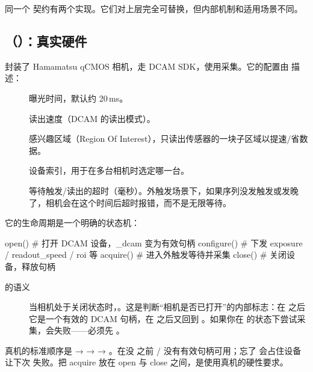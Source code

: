 \documentclass[11pt,oneside,openany]{book}
\begin{document}
同一个  契约有两个实现。它们对上层完全可替换，但内部机制和适用场景不同。

\subsection{（）：真实硬件}

 封装了 Hamamatsu qCMOS 相机，走 DCAM SDK，使用采集。它的配置由  描述：

\begin{description}
\item[] 曝光时间，默认约 20\,ms。
\item[] 读出速度（DCAM 的读出模式）。
\item[] 感兴趣区域（Region Of Interest），只读出传感器的一块子区域以提速/省数据。
\item[] 设备索引，用于在多台相机时选定哪一台。
\item[] 等待触发/读出的超时（毫秒）。外触发场景下，如果序列没发触发或发晚了，相机会在这个时间后超时报错，而不是无限等待。
\end{description}

它的生命周期是一个明确的状态机：

\begin{codeblock}[Python]
open()      # 打开 DCAM 设备，_dcam 变为有效句柄
configure() # 下发 exposure / readout_speed / roi 等
acquire()   # 进入外触发等待并采集
close()     # 关闭设备，释放句柄
\end{codeblock}

\begin{description}
\item[ 的语义] 当相机处于关闭状态时，。这是判断“相机是否已打开”的内部标志：在  之后它是一个有效的 DCAM 句柄，在  之后又回到 。如果你在  的状态下尝试采集，会失败——必须先 。
\end{description}

\begin{notebox}[控制流顺序不可乱]
真机的标准顺序是  →  →  → 。在没  之前 / 没有有效句柄可用；忘了  会占住设备让下次  失败。把 acquire 放在 open 与 close 之间，是使用真机的硬性要求。
\end{notebox}
\end{document}
